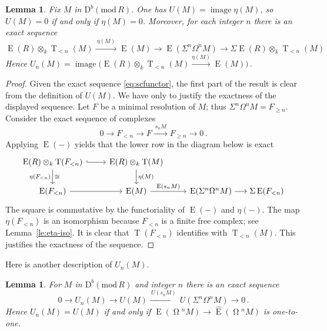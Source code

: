 \documentclass{amsart}
\numberwithin{equation}{section}
\theoremstyle{plain}
\newtheorem{lemma}[equation]{Lemma}
\theoremstyle{definition}
\theoremstyle{remark}
\newcommand{\dbcat}[1]{\mathrm{D}^b(\mathrm{mod}\,{#1})}
\newcommand{\eee}{\operatorname{E}}
\newcommand{\image}{\operatorname{image}}
\newcommand{\syz}{\operatorname{\Omega}\!}
\newcommand{\tee}{\operatorname{T}}
\begin{document}
\begin{lemma}
\label{le:Un-description}
Fix $M$ in $\dbcat R$. One has $U(M) = \image \eta(M)$, so $U(M)=0$ if and only if $\eta(M)=0$. Moreover, for each integer $n$ there is an exact sequence 
\[
\eee(R)\otimes_k \tee_{<n}(M)\xrightarrow{\ \eta(M)\ } \eee(M) \longrightarrow  \eee(\Sigma^n\Omega^nM) \longrightarrow
            \Sigma \eee(R)\otimes_k \tee_{<n}(M)
\]
Hence $U_n(M)= \image\big(\eee(R)\otimes_k \tee_{<n}(M)\xrightarrow{\eta(M)} \eee(M)\big)\,.$
\end{lemma}

\begin{proof}
Given the exact sequence \eqref{eq:scfunctor}, the first part of the result is clear from the definition of $U(M)$. We have only to justify the exactness of the displayed sequence. Let $F$ be a minimal resolution of $M$; thus $\Sigma^n\Omega^nM=F_{\geqslant n}$. Consider the exact sequence of complexes
 \[
 0\longrightarrow F_{<n}\longrightarrow F\xrightarrow{\ s_nM\ } F_{\geqslant n}\longrightarrow 0\,.
 \]
  Applying $\eee(-)$ yields that the lower row in the diagram below is exact
 \[
 \begin{tikzcd}
 \eee(R)\otimes_k\tee(F_{<n}) \arrow[d,"\eta(F_{<n})" swap, "\cong"]\arrow[r,hookrightarrow]
        &  \eee(R)\otimes_k\tee(M)\arrow[d,"\eta(M)"]  \\
\eee(F_{<n}) \arrow[r] & \eee(M) \arrow[r, " \eee(s_nM)"] & \eee(\Sigma^n\Omega^nM) \longrightarrow \Sigma \eee(F_{<n})
 \end{tikzcd}
 \]
The square is commutative by the functoriality of $\eee(-)$ and $\eta(-)$. The map $\eta(F_{<n})$ is an isomorphism because  $F_{<n}$ is a finite free complex; see Lemma~\ref{le:eta-iso}. It is clear that $\tee(F_{<n})$ identifies with $\tee_{<n}(M)$. This justifies the exactness of the sequence.
\end{proof}

Here is another description of $U_n(M)$.

\begin{lemma}
\label{le:Un-ses}
For $M$ in $\dbcat R$ and integer $n$ there is  an exact sequence
\[
0\longrightarrow U_n(M)\longrightarrow  U(M)\xrightarrow{\ U(s_nM)\ } U(\Sigma^n\Omega^nM)\longrightarrow 0\,.
\]
Hence $U_n(M)=U(M)$ if and only if $\eee(\syz^nM)\to\widehat{\eee}(\syz^nM)$ is one-to-one.
\end{lemma}
\end{document}
